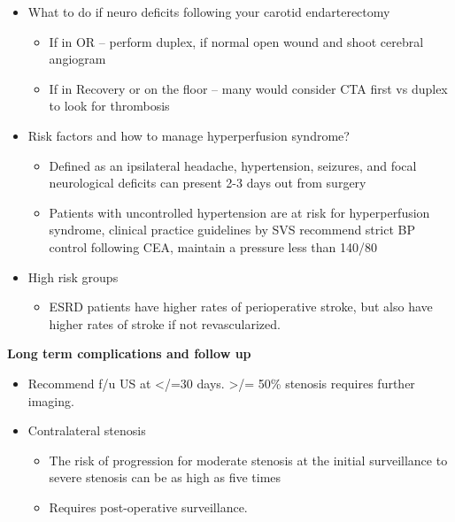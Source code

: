 \documentclass[
]{book}
\providecommand{\tightlist}{%
  \setlength{\itemsep}{0pt}\setlength{\parskip}{0pt}}
\begin{document}
\begin{itemize}
\item
  What to do if neuro deficits following your carotid endarterectomy

  \begin{itemize}
  \item
    If in OR -- perform duplex, if normal open wound and shoot
    cerebral angiogram
  \item
    If in Recovery or on the floor -- many would consider CTA first
    vs duplex to look for thrombosis
  \end{itemize}
\item
  Risk factors and how to manage hyperperfusion syndrome?

  \begin{itemize}
  \item
    Defined as an ipsilateral headache, hypertension, seizures, and
    focal neurological deficits can present 2-3 days out from
    surgery
  \item
    Patients with uncontrolled hypertension are at risk for
    hyperperfusion syndrome, clinical practice guidelines by SVS
    recommend strict BP control following CEA, maintain a pressure
    less than 140/80
  \end{itemize}
\item
  High risk groups

  \begin{itemize}
  \tightlist
  \item
    ESRD patients have higher rates of perioperative stroke, but
    also have higher rates of stroke if not revascularized.
    \citep{klarinPerioperativeLongtermImpact2016}
  \end{itemize}
\end{itemize}

\textbf{Long term complications and follow up}

\begin{itemize}
\item
  Recommend f/u US at \textless/=30 days. \textgreater/= 50\% stenosis requires further
  imaging.
\item
  Contralateral stenosis

  \begin{itemize}
  \item
    The risk of progression for moderate stenosis at the initial
    surveillance to severe stenosis can be as high as five times
  \item
    Requires post-operative surveillance.
  \end{itemize}
\end{itemize}
\end{document}
